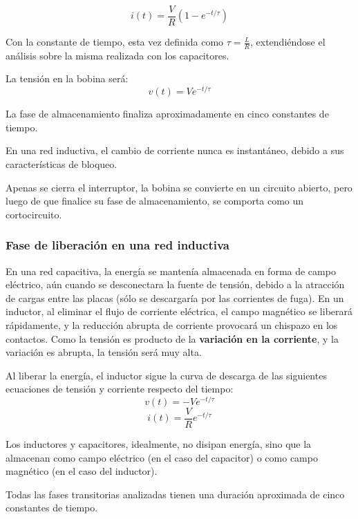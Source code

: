 \begin{equation}
	\label{eq:almacenamiento_inductor_i}
	i(t)=\frac{V}{R}(1-e^{-t / \tau})
\end{equation}

Con la constante de tiempo, esta vez definida como $\tau = \frac{L}{R} $, extendiéndose el análisis sobre la misma realizada con los capacitores.

La tensión en la bobina será:
\begin{equation}
	\label{eq:almacenamiento_inductor_v}
	v(t)=Ve^{-t / \tau}
\end{equation}

\begin{conclusiones}
	La fase de almacenamiento finaliza aproximadamente en cinco constantes de tiempo.
	
	En una red inductiva, el cambio de corriente nunca es instantáneo, debido a sus características de bloqueo.
	
	Apenas se cierra el interruptor, la bobina se convierte en un circuito abierto, pero luego de que finalice su fase de almacenamiento, se comporta como un cortocircuito.
\end{conclusiones}

\subsubsection{Fase de liberación en una red inductiva}

En una red capacitiva, la energía se mantenía almacenada en forma de campo eléctrico, aún cuando se desconectara la fuente de tensión, debido a la atracción de cargas entre las placas (sólo se descargaría por las corrientes de fuga). En un inductor, al eliminar el flujo de corriente eléctrica, el campo magnético se liberará rápidamente, y la reducción abrupta de corriente provocará un chispazo en los contactos. Como la tensión es producto de la \textbf{variación en la corriente}, y la variación es abrupta, la tensión será muy alta.

Al liberar la energía, el inductor sigue la curva de descarga de las siguientes ecuaciones de tensión y corriente respecto del tiempo:
\begin{equation}
	\label{eq:liberacion_inductor_v}
	v(t)=-Ve^{-t / \tau}
\end{equation}
\begin{equation}
	\label{eq:liberacion_inductor_v}
	i(t)=\frac{V}{R} e^{-t / \tau}
\end{equation}

\begin{conclusiones}
	Los inductores y capacitores, idealmente, no disipan energía, sino que la almacenan como campo eléctrico (en el caso del capacitor) o como campo magnético (en el caso del inductor).
	
	Todas las fases transitorias analizadas tienen una duración aproximada de cinco constantes de tiempo.
\end{conclusiones}
